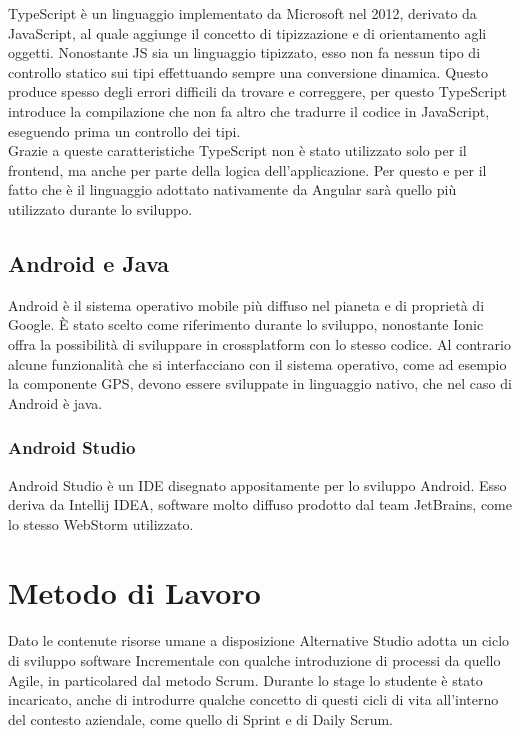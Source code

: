TypeScript è un linguaggio implementato da Microsoft nel 2012, derivato da JavaScript, al quale aggiunge il concetto di tipizzazione e di orientamento agli oggetti. Nonostante JS sia un linguaggio \gls{tipizzato}, esso non fa nessun tipo di controllo statico sui tipi effettuando sempre una conversione dinamica. Questo produce spesso degli errori difficili da trovare e correggere, per questo TypeScript introduce la compilazione che non fa altro che tradurre il codice in JavaScript, eseguendo prima un controllo dei tipi.\\
Grazie a queste caratteristiche TypeScript non è stato utilizzato solo per il \gls{frontend}, ma anche per parte della logica dell'applicazione. Per questo e per il fatto che è il linguaggio adottato nativamente da Angular sarà quello più utilizzato durante lo sviluppo.

\subsection{Android e Java}

\gls{Android} è il sistema operativo mobile più diffuso nel pianeta e di proprietà di \gls{Google}. È stato scelto come riferimento durante lo sviluppo, nonostante \gls{Ionic} offra la possibilità di sviluppare in crossplatform con lo stesso codice. Al contrario alcune funzionalità che si interfacciano con il sistema operativo, come ad esempio la componente GPS, devono essere sviluppate in linguaggio nativo, che nel caso di \gls{Android} è \gls{java}.

\subsubsection{Android Studio}
Android Studio è un IDE disegnato appositamente per lo sviluppo Android. Esso deriva da Intellij IDEA, software molto diffuso prodotto dal team JetBrains, come lo stesso WebStorm utilizzato.



\section{Metodo di Lavoro}
Dato le contenute risorse umane a disposizione Alternative Studio adotta un ciclo di sviluppo software \gls{Incrementale} con qualche introduzione di processi da quello \gls{Agile}, in particolared dal metodo \gls{Scrum}. Durante lo stage lo studente è stato incaricato, anche di introdurre qualche concetto di questi cicli di vita all'interno del contesto aziendale, come quello di \gls{Sprint} e di \gls{Daily Scrum}.

